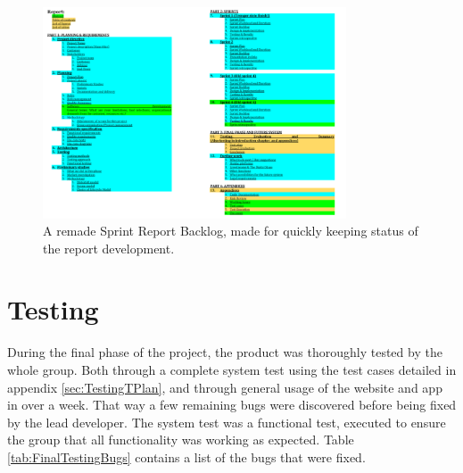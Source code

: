\begin{figure}[ht!]
\centering
\includegraphics[width=90mm]{./FinalSprint/img/ReportBacklog.png}
\caption{A remade Sprint Report Backlog, made for quickly keeping status of the report development. \label{fig:FinalReportBacklog}}
\end{figure}

\section{Testing}
\label{sec:FinalTesting}

During the final phase of the project, the product was thoroughly tested by the whole group. Both through a complete system test using the test cases detailed in appendix \ref{sec:TestingTPlan}, and through general usage of the website and app in over a week. That way a few remaining bugs were discovered before being fixed by the lead developer. The system test was a functional test, executed to ensure the group that all functionality was working as expected. Table \ref{tab:FinalTestingBugs} contains a list of the bugs that were fixed.

